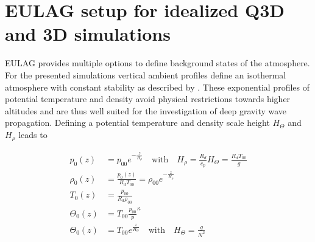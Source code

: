 







\section{EULAG setup for idealized Q3D and 3D simulations}

EULAG provides multiple options to define background states of the atmosphere. For the presented simulations vertical ambient profiles define an isothermal atmosphere with constant stability as described by \textcite{bacmeister_breakdown_1989}. These exponential profiles of potential temperature and density avoid physical restrictions towards higher altitudes and are thus well suited for the investigation of deep gravity wave propagation. Defining a potential temperature and density scale height $H_{\Theta}$ and $H_{\rho}$ leads to

\begin{equation}
\begin{aligned}
    p_0(z) &= p_{00} e^{-\frac{z}{H_{\rho}}} \quad \textrm{with} \quad H_{\rho} = \frac{R_d}{c_p} H_{\Theta} = \frac{R_d T_{00}}{g} \\
    \rho_0(z) &= \frac{p_0(z)}{R_d T_{00}} = \rho_{00} e^{-\frac{z}{H_{\rho}}} \\
    T_0(z) &= \frac{p_{00}}{R_d \rho_{00}} \\
    \Theta_0(z) &= T_{00} \frac{p_{00}}{p}^{\kappa} \\
    \Theta_0(z) &= T_{00} e^{\frac{z}{H_{\Theta}}} \quad \textrm{with} \quad H_{\Theta} = \frac{g}{N^2} \\
    \label{equ:ambient-Profiles}
\end{aligned}
\end{equation}

